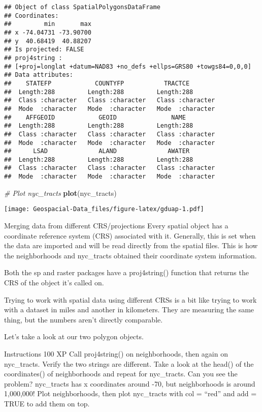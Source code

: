 \documentclass[]{article}
\newenvironment{Shaded}{\begin{snugshade}}{\end{snugshade}}
\newcommand{\CommentTok}[1]{\textcolor[rgb]{0.56,0.35,0.01}{\textit{#1}}}
\newcommand{\KeywordTok}[1]{\textcolor[rgb]{0.13,0.29,0.53}{\textbf{#1}}}
\newcommand{\NormalTok}[1]{#1}
\begin{document}
\begin{verbatim}
## Object of class SpatialPolygonsDataFrame
## Coordinates:
##         min       max
## x -74.04731 -73.90700
## y  40.68419  40.88207
## Is projected: FALSE 
## proj4string :
## [+proj=longlat +datum=NAD83 +no_defs +ellps=GRS80 +towgs84=0,0,0]
## Data attributes:
##    STATEFP            COUNTYFP           TRACTCE         
##  Length:288         Length:288         Length:288        
##  Class :character   Class :character   Class :character  
##  Mode  :character   Mode  :character   Mode  :character  
##    AFFGEOID            GEOID               NAME          
##  Length:288         Length:288         Length:288        
##  Class :character   Class :character   Class :character  
##  Mode  :character   Mode  :character   Mode  :character  
##      LSAD              ALAND              AWATER         
##  Length:288         Length:288         Length:288        
##  Class :character   Class :character   Class :character  
##  Mode  :character   Mode  :character   Mode  :character
\end{verbatim}

\begin{Shaded}
\begin{Highlighting}[]
\CommentTok{# Plot nyc_tracts}
\KeywordTok{plot}\NormalTok{(nyc_tracts)}
\end{Highlighting}
\end{Shaded}

\texttt{[image: Geospacial-Data\_files/figure-latex/gduap-1.pdf]}

Merging data from different CRS/projections Every spatial object has a
coordinate reference system (CRS) associated with it. Generally, this is
set when the data are imported and will be read directly from the
spatial files. This is how the neighborhoods and nyc\_tracts obtained
their coordinate system information.

Both the sp and raster packages have a proj4string() function that
returns the CRS of the object it's called on.

Trying to work with spatial data using different CRSs is a bit like
trying to work with a dataset in miles and another in kilometers. They
are measuring the same thing, but the numbers aren't directly
comparable.

Let's take a look at our two polygon objects.

Instructions 100 XP Call proj4string() on neighborhoods, then again on
nyc\_tracts. Verify the two strings are different. Take a look at the
head() of the coordinates() of neighborhoods and repeat for nyc\_tracts.
Can you see the problem? nyc\_tracts has x coordinates around -70, but
neighborhoods is around 1,000,000! Plot neighborhoods, then plot
nyc\_tracts with col = ``red'' and add = TRUE to add them on top.
\end{document}
